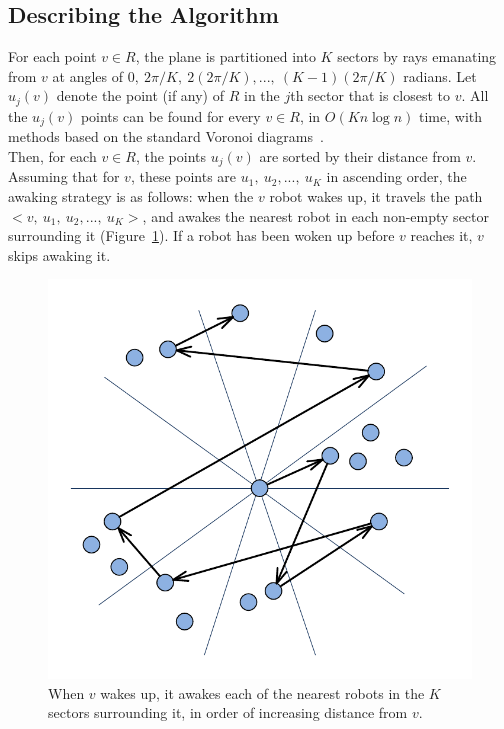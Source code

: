 \documentclass[review]{elsarticle}
\begin{document}
\subsection{Describing the Algorithm}
For each point $v\in R$, the plane is partitioned into $K$ sectors by rays emanating from $v$ at angles of
$0, ~2\pi/K, ~2(2\pi/K), ..., ~(K-1)(2\pi/K)$ radians.
Let $u_j(v)$ denote the point (if any) of $R$ in the $j$th sector that is closest to $v$.
All the $u_j(v)$ points can be found for every $v\in R$, in $O(Kn\log n)$ time, with methods based on the standard Voronoi diagrams~\cite{Clarkson1987}.\\
Then, for each $v\in R$, the points $u_j(v)$ are sorted by their distance from $v$. Assuming that for $v$, these points are ${ u_1,~u_2,...,~u_K }$ in ascending order, the awaking strategy is as follows: when the $v$ robot wakes up, it travels the path ${ <v,~u_1,~u_2,...,~u_K> }$, and awakes the nearest robot in each non-empty sector surrounding it (Figure~\ref{fig:thetagraph}). If a robot has been woken up before $v$ reaches it, $v$ skips awaking it.
\begin{figure} [h]
  \vspace{-10pt}
  \centering
  \includegraphics[scale=.5]{Figs/fig2.pdf}
  \vspace{-20pt}
  \caption{When $v$ wakes up, it awakes each of the nearest robots in the $K$ sectors surrounding it, in order of increasing distance from $v$.}
  \label{fig:thetagraph}
\end{figure}
\end{document}
